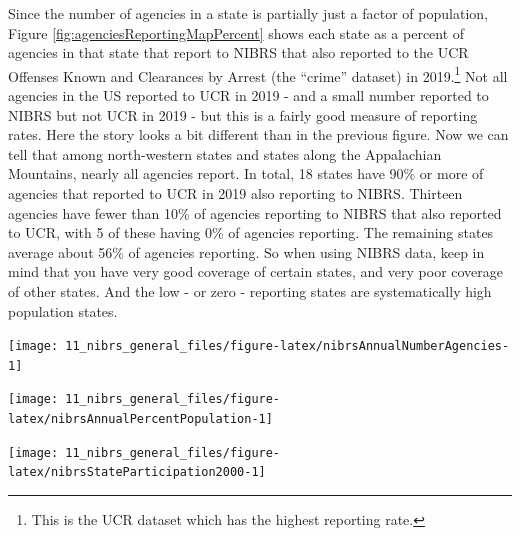 \documentclass[
]{krantz}
\let\origfigure\figure
\let\endorigfigure\endfigure
\renewenvironment{figure}[1][2] {
    \expandafter\origfigure\expandafter[H]
} {
    \endorigfigure
}
\begin{document}
Since the number of agencies in a state is partially just a
factor of population, Figure
\ref{fig:agenciesReportingMapPercent} shows each state as a
percent of agencies in that state that report to NIBRS that
also reported to the UCR Offenses Known and Clearances by
Arrest (the ``crime'' dataset) in 2019.\footnote{This is the
  UCR dataset which has the highest reporting rate.} Not all
agencies in the US reported to UCR in 2019 - and a small
number reported to NIBRS but not UCR in 2019 - but this is a
fairly good measure of reporting rates. Here the story looks
a bit different than in the previous figure. Now we can tell
that among north-western states and states along the
Appalachian Mountains, nearly all agencies report. In total,
18 states have 90\% or more of agencies that reported to UCR
in 2019 also reporting to NIBRS. Thirteen agencies have
fewer than 10\% of agencies reporting to NIBRS that also
reported to UCR, with 5 of these having 0\% of agencies
reporting. The remaining states average about 56\% of
agencies reporting. So when using NIBRS data, keep in mind
that you have very good coverage of certain states, and very
poor coverage of other states. And the low - or zero -
reporting states are systematically high population states.

\begin{figure}

{\centering \texttt{[image: 11\_nibrs\_general\_files/figure-latex/nibrsAnnualNumberAgencies-1]} 

}

\caption{The annual number of police agencies that report data to NIBRS.}\label{fig:nibrsAnnualNumberAgencies}
\end{figure}

\begin{figure}

{\centering \texttt{[image: 11\_nibrs\_general\_files/figure-latex/nibrsAnnualPercentPopulation-1]} 

}

\caption{The annual percent of the United States population that is covered by an agency reporting data to NIBRS.}\label{fig:nibrsAnnualPercentPopulation}
\end{figure}

\begin{figure}

{\centering \texttt{[image: 11\_nibrs\_general\_files/figure-latex/nibrsStateParticipation2000-1]} 

}

\caption{The percent of each state's population that is covered by police agencies reporting at least one month of data to NIBRS, 2000}\label{fig:nibrsStateParticipation2000}
\end{figure}
\end{document}
